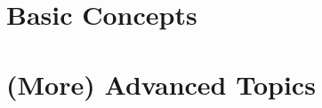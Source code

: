 \documentclass[11pt,twoside]{book}
\begin{document}
\frontmatter


\tableofcontents



\mainmatter
\setcounter{chapter}{-1}

\part{Basic Concepts}









\part{(More) Advanced Topics}






\backmatter
\cleardoublepage
{}
{}
\printindex
\end{document}
